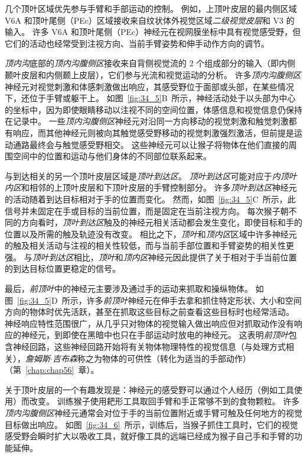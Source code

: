 几个顶叶区域优先参与手臂和手部运动的控制。
例如，上顶叶皮层的最内侧区域 V6A 和顶叶尾侧（PEc）区域接收来自纹状体外视觉区域\textit{二级视觉皮层}和 V3 的输入。
许多 V6A 和顶叶尾侧（PEc）神经元在视网膜坐标中具有视觉感受野，但它们的活动也经常受到注视方向、当前手臂姿势和伸手动作方向的调节。


\textit{顶内沟}底部的\textit{顶内沟腹侧区}接收来自背侧视觉流的 2 个组成部分的输入（即内侧颞叶皮层和内侧颞上皮层），它们参与光流和视觉运动的分析。
许多\textit{顶内沟腹侧区}神经元对视觉刺激和体感刺激做出响应，其感受野位于面部或头部，在某些情况下，还位于手臂或躯干上。
如图~\ref{fig:34_5}B~所示，神经活动处于以头部为中心的坐标中，因为即使眼睛移动以注视不同的空间位置，体感信息和视觉信息仍保持在记录中。
一些\textit{顶内沟腹侧区}神经元对沿同一方向移动的视觉刺激和触觉刺激都有响应，而其他神经元则被向其触觉感受野移动的视觉刺激强烈激活，但前提是运动通路最终会与触觉感受野相交。
这些神经元可以让猴子将物体在他们直接的周围空间中的位置和运动与他们身体的不同部位联系起来。


与到达相关的另一个顶叶皮层区域是\textit{顶叶到达区}。
\textit{顶叶到达区}可能对应于\textit{内顶叶内区}和相邻的上顶叶皮层和下顶叶皮层的手臂控制部分。
许多\textit{顶叶到达区}神经元的活动随着到达目标相对于手的位置而变化。
然而，如图~\ref{fig:34_5}C~所示，此信号并未固定在手或目标的当前位置，而是固定在当前注视方向。
每次猴子朝不同的方向看时，\textit{顶叶到达区}触及的神经元相关活动都会发生变化，即使目标和手的位置以及所需的触及轨迹没有改变。
相比之下，\textit{顶叶}和\textit{顶内区}区域中许多神经元的触及相关活动与注视的相关性较低，而与当前手部位置和手臂姿势的相关性更强。
与\textit{顶叶到达区}相比，\textit{顶叶}和\textit{顶内区}神经元因此提供了关于相对于手当前位置的到达目标位置更稳定的信号。


最后，\textit{前顶叶}中的神经元主要涉及通过手的运动来抓取和操纵物体。
如图~\ref{fig:34_5}D~所示，许多\textit{前顶叶}神经元在伸手去拿和抓住特定形状、大小和空间方向的物体时优先活跃，甚至在抓取这些目标之前查看这些目标时也经常活动。
神经响应特性范围很广，从几乎只对物体的视觉输入做出响应但对抓取动作没有响应的神经元，到即使在黑暗中也只在手部运动时放电的神经元。
这表明\textit{前顶叶}包含神经回路，这些神经回路开始将有关物体物理特性的视觉信息（与处理方式相关），\textit{詹姆斯$\cdot$吉布森}称之为物体的可供性（转化为适当的手部动作）（第~\ref{chap:chap56}~章）。


关于顶叶皮层的一个有趣发现是：神经元的感受野可以通过个人经历（例如工具使用）而改变。
训练猴子使用耙形工具取回手臂和手正常够不到的食物颗粒。
许多\textit{顶内沟腹侧区}神经元通常会对位于手的当前位置附近或手臂可触及任何地方的视觉目标做出响应。
如图~\ref{fig:34_6}~所示，训练后，当猴子抓住工具时，它们的视觉感受野会瞬时扩大以吸收工具，就好像工具的远端已经成为猴子自己手和手臂的功能延伸。


